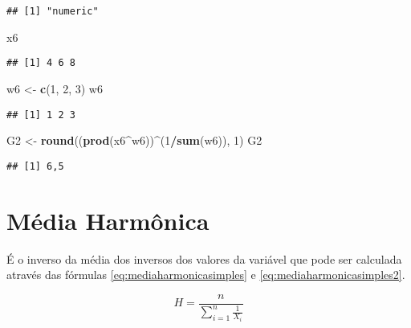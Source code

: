 \documentclass[
]{book}
\newenvironment{Shaded}{\begin{snugshade}}{\end{snugshade}}
\newcommand{\DecValTok}[1]{\textcolor[rgb]{0.00,0.00,0.81}{#1}}
\newcommand{\KeywordTok}[1]{\textcolor[rgb]{0.13,0.29,0.53}{\textbf{#1}}}
\newcommand{\NormalTok}[1]{#1}
\newcommand{\OperatorTok}[1]{\textcolor[rgb]{0.81,0.36,0.00}{\textbf{#1}}}
\newcommand{\StringTok}[1]{\textcolor[rgb]{0.31,0.60,0.02}{#1}}
\begin{document}
\begin{verbatim}
## [1] "numeric"
\end{verbatim}

\begin{Shaded}
\begin{Highlighting}[]
\NormalTok{x6}
\end{Highlighting}
\end{Shaded}

\begin{verbatim}
## [1] 4 6 8
\end{verbatim}

\begin{Shaded}
\begin{Highlighting}[]
\NormalTok{w6 <-}\StringTok{ }\KeywordTok{c}\NormalTok{(}\DecValTok{1}\NormalTok{, }\DecValTok{2}\NormalTok{, }\DecValTok{3}\NormalTok{)}
\NormalTok{w6}
\end{Highlighting}
\end{Shaded}

\begin{verbatim}
## [1] 1 2 3
\end{verbatim}

\begin{Shaded}
\begin{Highlighting}[]
\NormalTok{G2 <-}\StringTok{ }\KeywordTok{round}\NormalTok{((}\KeywordTok{prod}\NormalTok{(x6}\OperatorTok{^}\NormalTok{w6))}\OperatorTok{^}\NormalTok{(}\DecValTok{1}\OperatorTok{/}\KeywordTok{sum}\NormalTok{(w6)), }\DecValTok{1}\NormalTok{)}
\NormalTok{G2}
\end{Highlighting}
\end{Shaded}

\begin{verbatim}
## [1] 6,5
\end{verbatim}

\hypertarget{muxe9dia-harmuxf4nica}{%
\section{Média Harmônica}\label{muxe9dia-harmuxf4nica}}

É o inverso da média dos inversos dos valores da variável que pode ser calculada através das fórmulas \eqref{eq:mediaharmonicasimples} e \eqref{eq:mediaharmonicasimples2}.

\begin{equation}
    H = \frac{n}{\sum_{i=1}^{n}\frac{1}{X_i}}
    \label{eq:mediaharmonicasimples}
\end{equation}
\end{document}
